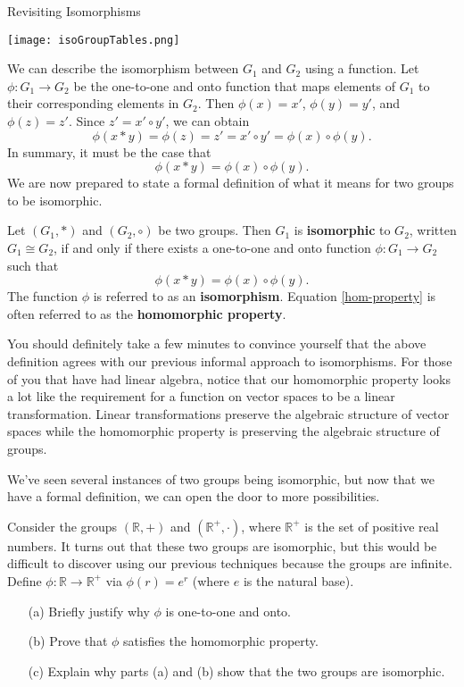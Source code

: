 \begin{section}{Revisiting Isomorphisms}
\begin{center}
\texttt{[image: isoGroupTables.png]}
\end{center}

We can describe the isomorphism between \(G_1\) and \(G_2\) using a function.  Let \(\phi:G_1\to G_2\) be the one-to-one and onto function that maps elements of \(G_1\) to their corresponding elements in \(G_2\).  Then \(\phi(x)=x'\), \(\phi(y)=y'\), and \(\phi(z)=z'\).  Since \(z'=x'\circ y'\), we can obtain
\[
\phi(x*y)=\phi(z)=z'=x'\circ y'=\phi(x)\circ \phi(y).
\]
In summary, it must be the case that 
\[
\phi(x*y)=\phi(x)\circ \phi(y).
\]
We are now prepared to state a formal definition of what it means for two groups to be isomorphic.

\begin{definition}\label{def:iso}
Let \((G_1,*)\) and \((G_2,\circ)\) be two groups.  Then \(G_1\) is \textbf{isomorphic} to \(G_2\), written \(G_1\cong G_2\), if and only if there exists a one-to-one and onto function \(\phi:G_1\to G_2\) such that
\begin{equation}\label{hom-property}
\phi(x*y)=\phi(x)\circ \phi(y).
\end{equation}
The function \(\phi\) is referred to as an \textbf{isomorphism}.  Equation \ref{hom-property} is often referred to as the \textbf{homomorphic property}.
\end{definition}

You should definitely take a few minutes to convince yourself that the above definition agrees with our previous informal approach to isomorphisms.  For those of you that have had linear algebra, notice that our homomorphic property looks a lot like the requirement for a function on vector spaces to be a linear transformation.  Linear transformations preserve the algebraic structure of vector spaces while the homomorphic property is preserving the algebraic structure of groups.

We've seen several instances of two groups being isomorphic, but now that we have a formal definition, we can open the door to more possibilities.

\begin{problem}
Consider the groups \((\mathbb{R},+)\) and \((\mathbb{R}^+,\cdot)\), where \(\mathbb{R}^+\) is the set of positive real numbers.  It turns out that these two groups are isomorphic, but this would be difficult to discover using our previous techniques because the groups are infinite.  Define \(\phi:\mathbb{R}\to \mathbb{R}^+\) via \(\phi(r)=e^r\) (where \(e\) is the natural base).
\begin{enumerate}
\item[(a)] Briefly justify why \(\phi\) is one-to-one and onto.
\item[(b)] Prove that \(\phi\) satisfies the homomorphic property.
\item[(c)] Explain why parts (a) and (b) show that the two groups are isomorphic.
\end{enumerate}
\end{problem}


\end{section}
